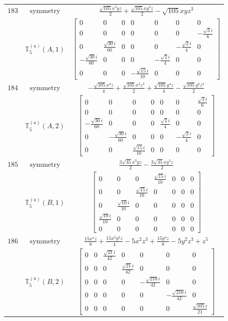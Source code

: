 \documentclass[fleqn,8pt,landscape]{jsarticle}
\begin{document}
\begin{longtable}{ccc}
$ 183 $ & $ \text{symmetry} $ & $ \frac{\sqrt{105} x^{3} y z}{2} + \frac{\sqrt{105} x y^{3} z}{2} - \sqrt{105} x y z^{3} $ \\
$  $ & $ \mathbb{T}_{5}^{(a)}(A,1) $ & $ \begin{bmatrix} 0 & 0 & 0 & 0 & 0 & 0 & 0 \\ 0 & 0 & 0 & 0 & 0 & 0 & - \frac{\sqrt{3} i}{6} \\ 0 & \frac{\sqrt{30} i}{60} & 0 & 0 & 0 & - \frac{\sqrt{2} i}{4} & 0 \\ - \frac{\sqrt{30} i}{60} & 0 & 0 & 0 & - \frac{\sqrt{2} i}{4} & 0 & 0 \\ 0 & 0 & 0 & - \frac{\sqrt{15} i}{10} & 0 & 0 & 0 \end{bmatrix} $ \\ \hline
$ 184 $ & $ \text{symmetry} $ & $ - \frac{\sqrt{105} x^{4} z}{4} + \frac{\sqrt{105} x^{2} z^{3}}{2} + \frac{\sqrt{105} y^{4} z}{4} - \frac{\sqrt{105} y^{2} z^{3}}{2} $ \\
$  $ & $ \mathbb{T}_{5}^{(a)}(A,2) $ & $ \begin{bmatrix} 0 & 0 & 0 & 0 & 0 & 0 & \frac{\sqrt{3} i}{6} \\ 0 & 0 & 0 & 0 & 0 & 0 & 0 \\ - \frac{\sqrt{30} i}{60} & 0 & 0 & 0 & \frac{\sqrt{2} i}{4} & 0 & 0 \\ 0 & - \frac{\sqrt{30} i}{60} & 0 & 0 & 0 & - \frac{\sqrt{2} i}{4} & 0 \\ 0 & 0 & \frac{\sqrt{15} i}{10} & 0 & 0 & 0 & 0 \end{bmatrix} $ \\ \hline
$ 185 $ & $ \text{symmetry} $ & $ \frac{3 \sqrt{35} x^{3} y z}{2} - \frac{3 \sqrt{35} x y^{3} z}{2} $ \\
$  $ & $ \mathbb{T}_{5}^{(a)}(B,1) $ & $ \begin{bmatrix} 0 & 0 & 0 & \frac{\sqrt{15} i}{10} & 0 & 0 & 0 \\ 0 & 0 & \frac{\sqrt{15} i}{10} & 0 & 0 & 0 & 0 \\ 0 & \frac{\sqrt{10} i}{10} & 0 & 0 & 0 & 0 & 0 \\ \frac{\sqrt{10} i}{10} & 0 & 0 & 0 & 0 & 0 & 0 \\ 0 & 0 & 0 & 0 & 0 & 0 & 0 \end{bmatrix} $ \\ \hline
$ 186 $ & $ \text{symmetry} $ & $ \frac{15 x^{4} z}{8} + \frac{15 x^{2} y^{2} z}{4} - 5 x^{2} z^{3} + \frac{15 y^{4} z}{8} - 5 y^{2} z^{3} + z^{5} $ \\
$  $ & $ \mathbb{T}_{5}^{(a)}(B,2) $ & $ \begin{bmatrix} 0 & 0 & \frac{\sqrt{21} i}{42} & 0 & 0 & 0 & 0 \\ 0 & 0 & 0 & \frac{\sqrt{21} i}{42} & 0 & 0 & 0 \\ 0 & 0 & 0 & 0 & - \frac{\sqrt{210} i}{42} & 0 & 0 \\ 0 & 0 & 0 & 0 & 0 & - \frac{\sqrt{210} i}{42} & 0 \\ 0 & 0 & 0 & 0 & 0 & 0 & \frac{\sqrt{105} i}{21} \end{bmatrix} $ \\ \hline

\end{longtable}
\end{document}
